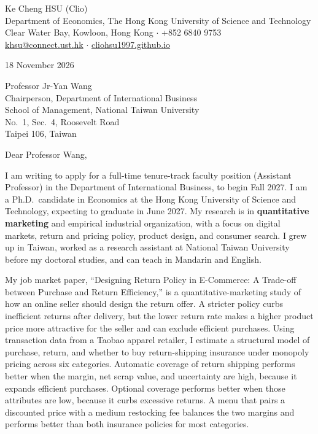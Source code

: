 \documentclass[11pt]{article}
\begin{document}
\begin{flushleft}
Ke Cheng HSU (Clio) \\
Department of Economics, The Hong Kong University of Science and Technology \\
Clear Water Bay, Kowloon, Hong Kong $\cdot$ +852 6840 9753 \\
\href{mailto:khsu@connect.ust.hk}{khsu@connect.ust.hk} $\cdot$ \href{https://cliohsu1997.github.io/}{cliohsu1997.github.io}
\end{flushleft}

18 November 2026

\vspace{0.12em}
Professor Jr-Yan Wang \\
Chairperson, Department of International Business \\
School of Management, National Taiwan University \\
No.\ 1, Sec.\ 4, Roosevelt Road \\
Taipei 106, Taiwan

\vspace{0.12em}
Dear Professor Wang,

I am writing to apply for a full-time tenure-track faculty position (Assistant Professor) in the Department of International Business, to begin Fall 2027. I am a Ph.D.\ candidate in Economics at the Hong Kong University of Science and Technology, expecting to graduate in June 2027. My research is in \textbf{quantitative marketing} and empirical industrial organization, with a focus on digital markets, return and pricing policy, product design, and consumer search. I grew up in Taiwan, worked as a research assistant at National Taiwan University before my doctoral studies, and can teach in Mandarin and English.

My job market paper, ``Designing Return Policy in E-Commerce: A Trade-off between Purchase and Return Efficiency,'' is a quantitative-marketing study of how an online seller should design the return offer. A stricter policy curbs inefficient returns after delivery, but the lower return rate makes a higher product price more attractive for the seller and can exclude efficient purchases. Using transaction data from a Taobao apparel retailer, I estimate a structural model of purchase, return, and whether to buy return-shipping insurance under monopoly pricing across six categories. Automatic coverage of return shipping performs better when the margin, net scrap value, and uncertainty are high, because it expands efficient purchases. Optional coverage performs better when those attributes are low, because it curbs excessive returns. A menu that pairs a discounted price with a medium restocking fee balances the two margins and performs better than both insurance policies for most categories.
\end{document}
